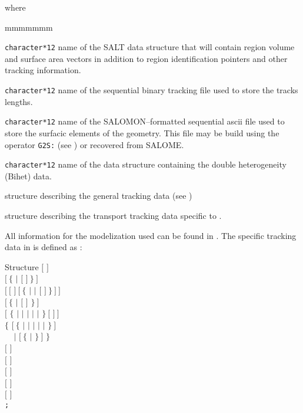 \noindent  where
\begin{ListeDeDescription}{mmmmmmm}

\item[\dusa{TRKNAM}] \texttt{character*12} name of the SALT  data
structure that will contain region volume and surface area vectors in
addition to region identification pointers and other tracking information.

\item[\dusa{TRKFIL}] \texttt{character*12} name of the sequential binary tracking
file used to store the tracks lengths.

\item[\dusa{SURFIL}] \texttt{character*12} name of the SALOMON--formatted sequential {\sc ascii}
file used to store the surfacic elements of the geometry. This file may be build
using the operator {\tt G2S:} (see ) or recovered from SALOME.

\item[\dusa{GEONAM}] {\tt character*12} name of the  data
structure containing the double heterogeneity (Bihet) data.

\item[\dstr{desctrack}] structure describing the general tracking data (see
)

\item[\dstr{descsalt}] structure describing the transport tracking data
specific to .

\end{ListeDeDescription}

\vskip 0.2cm

All information for the modelization used can be found in .
The  specific tracking data in  is defined as :

\begin{DataStructure}{Structure }
$[$   $]$ \\
$[~\{$   $|$  $[$   $]~\}~]$\\
$[~[$   $]~[~\{$  $|$  $|$  $[$  $]~\}~]~]$ \\
$[~\{$  $|$  $[$   $]$ $\}~]$ \\
$[$ $\{$   $|$  $|$  $|$  $|$  $|$  $\}~[$  $]~]$ \\
$\{$  $[~\{$  $|$  $|$  $|$  $|$  $|$  $\}~]$   \\
$~~~~~|$  $[~\{$  $|$  $\}~]$   $\}$ \\
$[$   $]$ \\
$[$  $]$\\
$[$   $]$ \\
$[$  $]$\\
$[$  $]$\\
{\tt ;}
\end{DataStructure}

